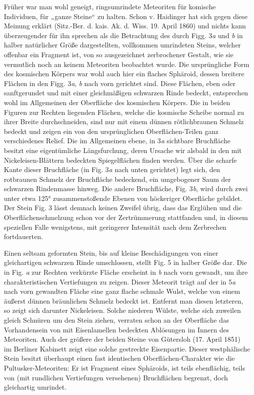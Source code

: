 \documentclass[a4paper, 11pt, oneside, german]{article}
\begin{document}
Früher war man wohl geneigt, ringsumrindete Meteoriten für komische Individuen, für „ganze Steine“ zu halten. Schon v. Haidinger hat sich gegen diese Meinung erklärt (Sitz.-Ber. d. kais. Ak. d. Wiss. 19. April 1860) und nichts kann überzeugender für ihn sprechen als die Betrachtung des durch Figg. 3\emph{a} und \emph{b} in halber natürlicher Größe dargestellten, vollkommen umrindeten Steins, welcher offenbar ein Fragment ist, von so ausgezeichnet zerbrochener Gestalt, wie sie vermutlich noch an keinem Meteoriten beobachtet wurde. Die ursprüngliche Form des kosmischen Körpers war wohl auch hier ein flaches Sphäroid, dessen breitere Flächen in den Figg. 3\emph{a}, \emph{b} nach vorn gerichtet sind. Diese Flächen, eben oder sanftgerundet und mit einer gleichmäßigen schwarzen Rinde bedeckt, entsprechen wohl im Allgemeinen der Oberfläche des kosmischen Körpers. Die in beiden Figuren zur Rechten liegenden Flächen, welche die kosmische Scheibe normal zu ihrer Breite durchschneiden, sind nur mit einem dünnen rötlichbraunen Schmelz bedeckt und zeigen ein von den ursprünglichen Oberflächen-Teilen ganz verschiedenes Relief. Die im Allgemeinen ebene, in 3\emph{a} sichtbare Bruchfläche besitzt eine eigentümliche Längsfurchung, deren Ursache wir alsbald in den mit Nickeleisen-Blättern bedeckten Spiegelflächen finden werden. Über die scharfe Kante dieser Bruchfläche (in Fig. 3\emph{a} nach unten gerichtet) legt sich, den rotbraunen Schmelz der Bruchfläche bedeckend, ein umgebogener Saum der schwarzen Rindenmasse hinweg. Die andere Bruchfläche, Fig. 3\emph{b}, wird durch zwei unter etwa 125° zusammenstoßende Ebenen von höckeriger Oberfläche gebildet. Der Stein Fig. 3 lässt demnach keinen Zweifel übrig, dass das Erglühen und die Oberflächenschmelzung schon vor der Zertrümmerung stattfanden und, in diesem speziellen Falle wenigstens, mit geringerer Intensität nach dem Zerbrechen fortdauerten.

Einen seltsam geformten Stein, bis auf kleine Beschädigungen von einer gleichartigen schwarzen Rinde umschlossen, stellt Fig. 5 in halber Größe dar. Die in Fig. \emph{a} zur Rechten verkürzte Fläche erscheint in \emph{b} nach vorn gewandt, um ihre charakteristischen Vertiefungen zu zeigen. Dieser Meteorit trägt auf der in 5\emph{a} nach vorn gewandten Fläche eine ganz flache schmale Wulst, welche von einem äußerst dünnen bräunlichen Schmelz bedeckt ist. Entfernt man diesen letzteren, so zeigt sich darunter Nickeleisen. Solche niederen Wülste, welche sich zuweilen gleich Schnüren um den Stein ziehen, verraten schon an der Oberfläche das Vorhandensein von mit Eisenlamellen bedeckten Ablösungen im Innern des Meteoriten. Auch der größere der beiden Steine von Gütersloh (17. April 1851) im Berliner Kabinett zeigt eine solche gestreckte Eisenpartie. Dieser westphälische Stein besitzt überhaupt einen fast identischen Oberflächen-Charakter wie die Pultusker-Meteoriten: Er ist Fragment eines Sphäroids, ist teils ebenflächig, teils von (mit rundlichen Vertiefungen versehenen) Bruchflächen begrenzt, doch gleichartig umrindet.
\end{document}
